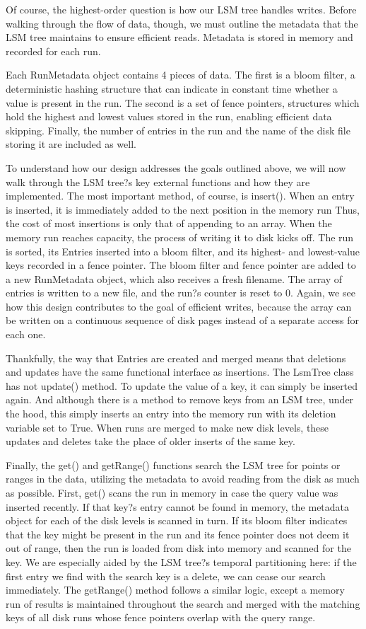 \documentclass[12pt]{article}
\begin{document}
	Of course, the highest-order question is how our LSM tree handles writes. Before walking through the flow of data, though, we must outline the metadata that the LSM tree maintains to ensure efficient reads. Metadata is stored in memory and recorded for each run.
	
	Each RunMetadata object contains 4 pieces of data. The first is a bloom filter, a deterministic hashing structure that can indicate in constant time whether a value is present in the run. The second is a set of fence pointers, structures which hold the highest and lowest values stored in the run, enabling efficient data skipping. Finally, the number of entries in the run and the name of the disk file storing it are included as well.
	
	To understand how our design addresses the goals outlined above, we will now walk through the LSM tree?s key external functions and how they are implemented. The most important method, of course, is insert(). When an entry is inserted, it is immediately added to the next position in the memory run Thus, the cost of most insertions is only that of appending to an array. When the memory run reaches capacity, the process of writing it to disk kicks off. The run is sorted, its Entries inserted into a bloom filter, and its highest- and lowest-value keys recorded in a fence pointer. The bloom filter and fence pointer are added to a new RunMetadata object, which also receives a fresh filename. The array of entries is written to a new file, and the run?s counter is reset to 0. Again, we see how this design contributes to the goal of efficient writes, because the array can be written on a continuous sequence of disk pages instead of a separate access for each one.
	
	Thankfully, the way that Entries are created and merged means that deletions and updates have the same functional interface as insertions. The LsmTree class has not update() method. To update the value of a key, it can simply be inserted again. And although there is a method to remove keys from an LSM tree, under the hood, this simply inserts an entry into the memory run with its deletion variable set to True. When runs are merged to make new disk levels, these updates and deletes take the place of older inserts of the same key.
	
	Finally, the get() and getRange() functions search the LSM tree for points or ranges in the data, utilizing the metadata to avoid reading from the disk as much as possible. First, get() scans the run in memory in case the query value was inserted recently. If that key?s entry cannot be found in memory, the metadata object for each of the disk levels is scanned in turn. If its bloom filter indicates that the key might be present in the run and its fence pointer does not deem it out of range, then the run is loaded from disk into memory and scanned for the key. We are especially aided by the LSM tree?s temporal partitioning here: if the first entry we find with the search key is a delete, we can cease our search immediately. The getRange() method follows a similar logic, except a memory run of results is maintained throughout the search and merged with the matching keys of all disk runs whose fence pointers overlap with the query range.
	
\end{document}

